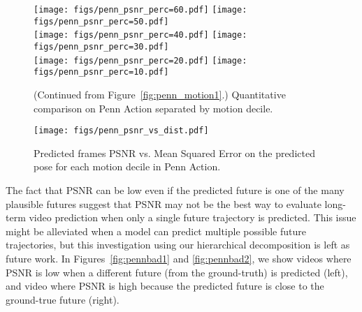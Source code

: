 \documentclass{article}
\begin{document}
\begin{appendix}
\clearpage
\begin{figure}[htb!]
\vspace{30pt}
\centering
\texttt{[image: figs/penn\_psnr\_perc=60.pdf]}
\hspace{.8cm}
\texttt{[image: figs/penn\_psnr\_perc=50.pdf]}\\
\texttt{[image: figs/penn\_psnr\_perc=40.pdf]}
\hspace{.8cm}
\texttt{[image: figs/penn\_psnr\_perc=30.pdf]}\\
\texttt{[image: figs/penn\_psnr\_perc=20.pdf]}
\hspace{.8cm}
\texttt{[image: figs/penn\_psnr\_perc=10.pdf]}
\vspace{-.3cm}
\caption{(Continued from Figure~\ref{fig:penn_motion1}.) Quantitative comparison on Penn Action separated by motion decile.}
\label{fig:penn_motion2}
\end{figure}

\begin{figure}[htb!]
\centering
\texttt{[image: figs/penn\_psnr\_vs\_dist.pdf]}
\vspace{-.3cm}
\caption{Predicted frames PSNR vs. Mean Squared Error on the predicted pose for each motion decile in Penn Action.}
\label{fig:penn_corr}
\end{figure}
The fact that PSNR can be low even if the predicted future is one of the many plausible futures suggest that PSNR may not be the best way to evaluate long-term video prediction when only a single future trajectory is predicted.
This issue might be alleviated when a model can predict multiple possible future trajectories, but this investigation using our hierarchical decomposition is left as future work. 
In Figures~\ref{fig:pennbad1} and \ref{fig:pennbad2}, we show videos where PSNR is low when a different future (from the ground-truth) is predicted (left), and video where PSNR is high because the predicted future is close to the ground-true future (right).


\end{appendix}
\end{document}

